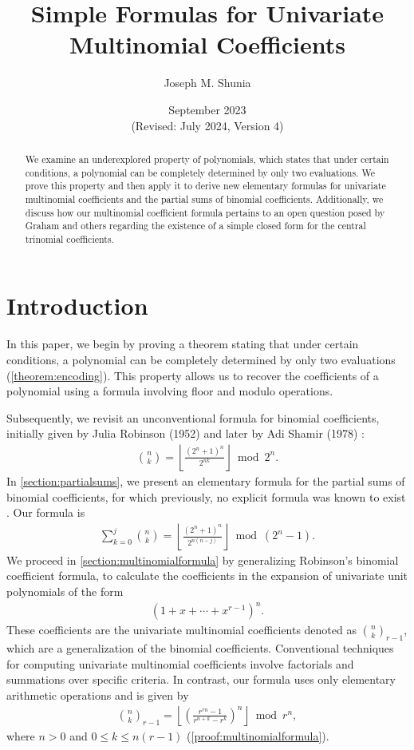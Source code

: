 \documentclass{article}
\title{Simple Formulas for Univariate Multinomial Coefficients}
\author{Joseph M. Shunia}
\date{September 2023 \\ \small (Revised: July 2024, Version 4) \normalsize}
\theoremstyle{plain}
\theoremstyle{definition}
\newcommand{\floor}[1]{\left\lfloor #1 \right\rfloor}
\begin{document}
\maketitle

\begin{abstract}
We examine an underexplored property of polynomials, which states that under certain conditions, a polynomial can be completely determined by only two evaluations. We prove this property and then apply it to derive new elementary formulas for univariate multinomial coefficients and the partial sums of binomial coefficients. Additionally, we discuss how our multinomial coefficient formula pertains to an open question posed by Graham and others regarding the existence of a simple closed form for the central trinomial coefficients.
\end{abstract}

\section{Introduction}
In this paper, we begin by proving a theorem stating that under certain conditions, a polynomial can be completely determined by only two evaluations (\cref{theorem:encoding}). This property allows us to recover the coefficients of a polynomial using a formula involving floor and modulo operations.

Subsequently, we revisit an unconventional formula for binomial coefficients, initially given by Julia Robinson (1952) \cite{robinson1952arithmetic} and later by Adi Shamir (1978) \cite{shamir1978factoring}:
\begin{align*}
\binom{n}{k} = \left\lfloor\frac{(2^n+1)^n}{2^{n k}}\right\rfloor \bmod{2^{n}} .
\end{align*}
In \cref{section:partialsums}, we present an elementary formula for the partial sums of binomial coefficients, for which previously, no explicit formula was known to exist \cite{boardman2004eggdropnumbers}. Our formula is
\begin{align*}
\sum_{k=0}^{j} \binom{n}{k}
= \floor{\frac{(2^n+1)^n}{2^{n(n-j)}}} \bmod (2^n-1) .
\end{align*}
We proceed in \cref{section:multinomialformula} by generalizing Robinson's binomial coefficient formula, to calculate the coefficients in the expansion of univariate unit polynomials of the form
\begin{align*}
 [x^k](1 + x + \cdots + x^{r-1})^n .
\end{align*}
These coefficients are the univariate multinomial coefficients denoted as $\binom{n}{k}_{r-1}$, which are a generalization of the binomial coefficients. Conventional techniques for computing univariate multinomial coefficients involve factorials and summations over specific criteria. In contrast, our formula uses only elementary arithmetic operations and is given by
\begin{align*}
    \binom{n}{k}_{r-1} = \left\lfloor\left(\frac{r^{rn} - 1}{r^{n+k} - r^k}\right)^n\right\rfloor \bmod r^n ,
\end{align*}
where $n > 0$ and $0 \leq k \leq n (r-1)$ (\cref{proof:multinomialformula}).
\end{document}
